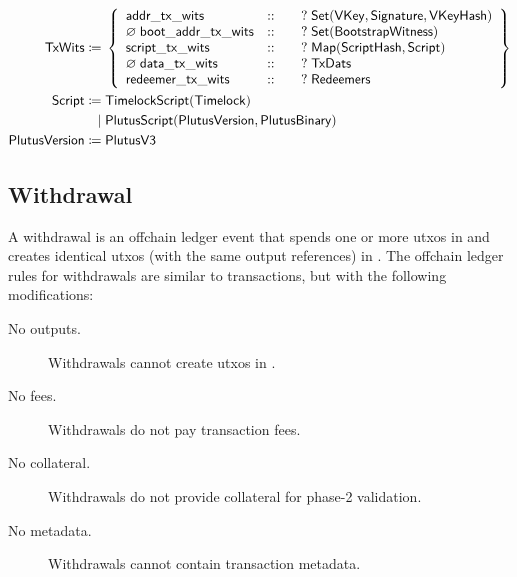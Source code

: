 \documentclass[../hydrozoa.tex]{subfiles}
\begin{document}
\begin{align*}
    \mathsf{TxWits} \coloneq\;& \left\{
    \begin{array}{lll}
      \mathsf{addr\_tx\_wits} &::& \quad?\;\mathsf{Set(VKey, Signature, VKeyHash)} \\
        \varnothing\;\mathsf{boot\_addr\_tx\_wits} &::& \quad?\;\mathsf{Set(BootstrapWitness)} \\
        \mathsf{script\_tx\_wits} &::& \quad?\;\mathsf{Map(ScriptHash, Script)} \\
        \varnothing\;\mathsf{data\_tx\_wits} &::& \quad?\;\mathsf{TxDats} \\
        \mathsf{redeemer\_tx\_wits} &::& \quad?\;\mathsf{Redeemers}
    \end{array} \right\}\\
    \mathsf{Script} \coloneq\;& \mathsf{TimelockScript}(\mathsf{Timelock}) \\
                          \mid\;& \mathsf{PlutusScript}(\mathsf{PlutusVersion},\mathsf{PlutusBinary}) \\
    \mathsf{PlutusVersion} \coloneq\;& \mathsf{PlutusV3}
\end{align*}
\endgroup

\subsection{Withdrawal}%
\label{h:ledger-withdrawal}

A withdrawal is an offchain ledger event that spends one or more utxos in  and creates identical utxos (with the same output references) in .
The offchain ledger rules for withdrawals are similar to transactions, but with the following modifications:
\begin{description}
  \item[No outputs.] Withdrawals cannot create utxos in .
  \item[No fees.] Withdrawals do not pay transaction fees.
  \item[No collateral.] Withdrawals do not provide collateral for phase-2 validation.
  \item[No metadata.] Withdrawals cannot contain transaction metadata.
\end{description}
\end{document}

